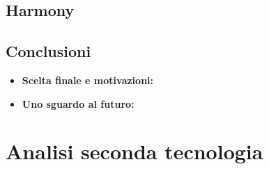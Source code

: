 \documentclass[a4paper, 12pt]{article}
\begin{document}
\subsection*{Harmony}

\subsection*{Conclusioni}
\begin{itemize}

    \item \textbf{Scelta finale e motivazioni: }

    \item \textbf{Uno sguardo al futuro: }

\end{itemize}

\section{Analisi seconda tecnologia}
\end{document}
